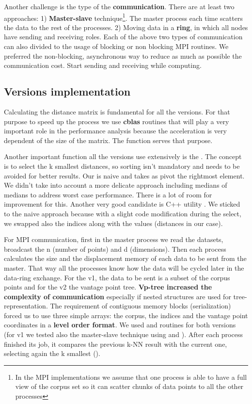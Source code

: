 \documentclass[12pt, a4paper]{article}
\begin{document}
Another challenge is the type of the \textbf{communication}. There are at least two approaches: 1) \textbf{Master-slave} technique\footnote{In the MPI implementations we assume that one process is able to have a full view of the corpus set so it can scatter chunks of data points to all the other processes}. The master process each time scatters the data to the rest of the processes. 2) Moving data in a \textbf{ring}, in which all nodes have sending and receiving roles.
Each of the above two types of communication can also divided to the usage of blocking or non blocking MPI routines. We preferred the non-blocking, asynchronous way to reduce as much as possible the communication cost. Start sending and receiving while computing.


\subsection{Versions implementation}

Calculating the distance matrix is fundamental for all the versions. For that purpose to speed up the process we use \textbf{cblas} routines that will play a very important role in the performance analysis because the acceleration is very dependent of the size of the matrix. The function  serves that purpose.

Another important function all the versions use extensively is the . The concept is to select the k smallest distances, so sorting isn't mandatory and needs to be avoided for better results. Our  is naive and takes as pivot the rightmost element. We didn't take into account a more delicate approach including medians of medians to address worst case performance. There is a lot of room for improvement for this. Another very good candidate is C++ utility . We sticked to the naive approach because with a slight code modification during the select, we swapped also the indices along with the values (distances in our case). 

For MPI communication, first in the master process we read the datasets, broadcast the n (number of points) and d (dimensions). Then each process calculates the size and the displacement memory of each data to be sent from the master. That way all the processes know how the data will be cycled later in the data-ring exchange. For the v1, the data to be sent is a subset of the corpus points and for the v2 the vantage point tree. \textbf{Vp-tree increased the complexity of communication} especially if nested structures are used for tree-representation. The requirement of contiguous memory blocks (serialization) forced us to use three simple arrays: the corpus, the indices and the vantage point coordinates in a \textbf{level order format}. We used  and  routines for both versions (for v1 we tested also the master-slave technique using  and  ). After each process finished its job, it compares the previous k-NN result with the current one, selecting again the k smallest ().
\end{document}
